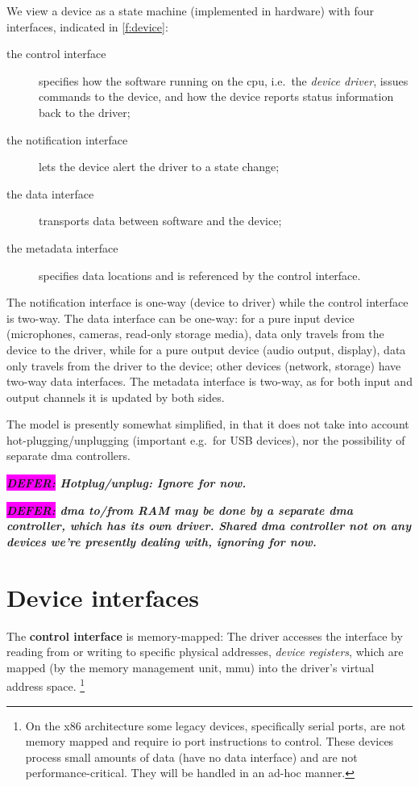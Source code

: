 \documentclass[a4paper,12pt]{report}
\newcommand{\DEFER}[1]{\textbf{\textsl{\colorbox{magenta}{DEFER:} #1}}}
\newcommand{\DEFER}[1]{\relax}
\begin{document}
We view a device as a state machine (implemented in hardware) with four interfaces, indicated
in \autoref{f:device}:
\begin{description}
\item[the control interface] specifies how the software running on the
  \gls{cpu}, i.e.\ the \emph{device driver}, issues commands to
  the device, and how the device reports status information back to the driver;
\item [the notification interface] lets the device alert the driver to a
  state change;
\item [the data interface] transports data between software and the
  device;
\item[the metadata interface] specifies data locations and is
  referenced by the control interface.
\end{description}

The notification interface is one-way (device to driver) while the
control interface is two-way. The data interface can be one-way: for a
pure  input device (microphones, cameras, read-only storage media), data only travels from
the device to the driver, while for a pure output device
(audio output, display), data only
travels from the driver to the device; other devices (network,
storage) have two-way data interfaces. The metadata interface is
two-way, as for both input and output channels it is updated by both
sides.

The model is presently somewhat simplified, in that it does not take
into account hot-plugging/unplugging (important e.g.\ for USB devices),
nor the possibility of separate \gls{dma} controllers.

\DEFER{Hotplug/unplug: Ignore for now.}

\DEFER{\gls{dma} to/from RAM may be done by a separate \gls{dma} controller,
  which has its own driver. Shared \gls{dma} controller not on any devices
  we're presently dealing with, ignoring for now.}

\section{Device interfaces}

The \textbf{control interface} is memory-mapped: The driver accesses the
interface by reading from or writing to specific physical addresses,
\emph{device registers}, which are mapped (by the memory management
unit, \gls{mmu}) into the driver's virtual address space.%
\footnote{On the x86 architecture some legacy devices, specifically
  serial ports, are not memory mapped and require \gls{io} port instructions to
  control.  These devices process small amounts of data (have no data
  interface) and are not performance-critical. They will be handled in
  an ad-hoc manner.}
\end{document}
